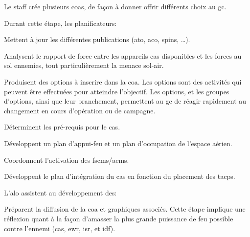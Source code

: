 Le staff crée plusieurs \glspl{coa}, de façon à donner offrir différents choix au \gls{gc}.

Durant cette étape, les planificateurs:

\begin{e1}
	\item Mettent à jour les différentes publications (\gls{ato}, \gls{aco}, \gls{spins}, \ldots{}).
	\item Analysent le rapport de force entre les appareils \gls{cas} disponibles et les forces au sol ennemies, tout particulièrement la menace sol-air.
	\item Produisent des options à inscrire dans la \gls{coa}. Les options sont des activités qui peuvent être effectuées pour atteindre l'objectif. Les options, et les groupes d'options, ainsi que leur branchement, permettent au \gls{gc} de réagir rapidement au changement en cours d'opération ou de campagne.
	\item Déterminent les pré-requis pour le \gls{cas}.
	\item Développent un plan d'appui-feu et un plan d'occupation de l'espace aérien.
	\item Coordonnent l'activation des \glspl{fscm}/\glspl{acm}.
	\item Développent le plan d'intégration du \gls{cas} en fonction du placement des \glspl{tacp}.
	\item L'\gls{alo} assistent au développement des:
	\item Préparent la diffusion de la \gls{coa} et graphiques associés. Cette étape implique une réflexion quant à la façon d'amasser la plus grande puissance de feu possible contre l'ennemi (\gls{cas}, \gls{ewr}, \gls{isr}, et \gls{idf}).
	

\end{e1}
